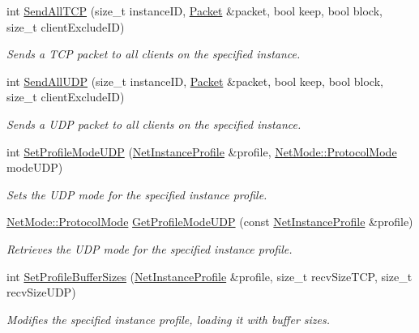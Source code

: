 \begin{DoxyCompactItemize}
int \hyperlink{namespacemn_a0294004c6f4549d4c1dc403551ccd6d1}{SendAllTCP} (size\_\-t instanceID, \hyperlink{class_packet}{Packet} \&packet, bool keep, bool block, size\_\-t clientExcludeID)
\begin{DoxyCompactList}\small\item\em Sends a TCP packet to all clients on the specified instance. \item\end{DoxyCompactList}\item 
int \hyperlink{namespacemn_a83608bf51559da75a3ea3411d2a386ad}{SendAllUDP} (size\_\-t instanceID, \hyperlink{class_packet}{Packet} \&packet, bool keep, bool block, size\_\-t clientExcludeID)
\begin{DoxyCompactList}\small\item\em Sends a UDP packet to all clients on the specified instance. \item\end{DoxyCompactList}\item 
int \hyperlink{namespacemn_ad500886a9ca404e1fd2a4c4568e42a4b}{SetProfileModeUDP} (\hyperlink{class_net_instance_profile}{NetInstanceProfile} \&profile, \hyperlink{class_net_mode_a43cfa55ee6a4db66a8d7d6c27f766964}{NetMode::ProtocolMode} modeUDP)
\begin{DoxyCompactList}\small\item\em Sets the UDP mode for the specified instance profile. \item\end{DoxyCompactList}\item 
\hyperlink{class_net_mode_a43cfa55ee6a4db66a8d7d6c27f766964}{NetMode::ProtocolMode} \hyperlink{namespacemn_a7487a6626a20e589983d4b513f965343}{GetProfileModeUDP} (const \hyperlink{class_net_instance_profile}{NetInstanceProfile} \&profile)
\begin{DoxyCompactList}\small\item\em Retrieves the UDP mode for the specified instance profile. \item\end{DoxyCompactList}\item 
int \hyperlink{namespacemn_a55055a7e62d51d95aa6532f730d0a581}{SetProfileBufferSizes} (\hyperlink{class_net_instance_profile}{NetInstanceProfile} \&profile, size\_\-t recvSizeTCP, size\_\-t recvSizeUDP)
\begin{DoxyCompactList}\small\item\em Modifies the specified instance profile, loading it with buffer sizes. \item\end{DoxyCompactList}\item 

\end{DoxyCompactItemize}
